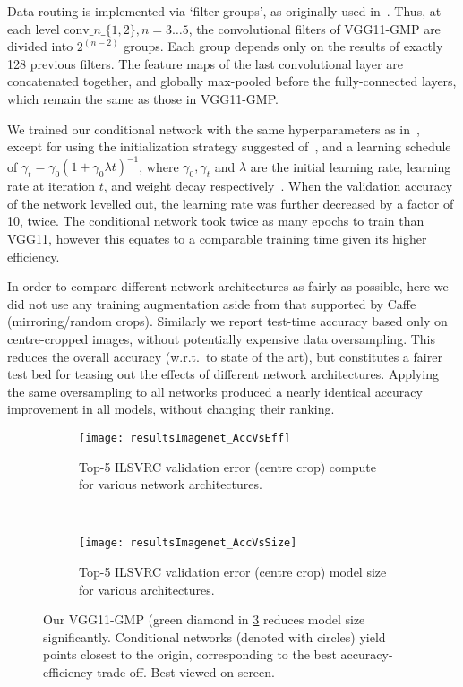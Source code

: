 \documentclass[thesis]{subfiles}
\begin{document}
Data routing is implemented via `filter groups', as originally used in~\cite{Krizhevsky2012imanet}. 
Thus, at each level $\textrm{conv}\_n\_\{1,2\}, n=3\ldots 5$, the convolutional filters of VGG11-GMP are 
divided into $2^{(n-2)}$ groups. Each group depends only on the results of exactly 128 previous filters. 
The feature maps of the last convolutional layer are concatenated together, and globally max-pooled
 before the fully-connected layers, which remain the same as those in VGG11-GMP.

We trained our conditional network with the same hyperparameters as in~\cite{Simonyan2014verydeep}, 
except for using the initialization strategy suggested of~\cite{He2015delving}, and a learning schedule of 
$\gamma_t = \gamma_0(1+\gamma_0\lambda t)^{-1}$, where $\gamma_0,\gamma_t$ and $\lambda$ 
are the initial learning rate, learning rate at iteration $t$, and weight decay respectively~\cite{Bottou2012sgdtricks}. 
When the validation accuracy of the network levelled out, the learning rate was further decreased by a factor of 10, twice. 
The conditional network took twice as many epochs to train than VGG11, however this equates to a comparable
 training time given its higher efficiency.

In order to compare different network architectures as fairly as possible, here we did not use any training
 augmentation aside from that supported by Caffe (mirroring/random crops). Similarly we report test-time 
 accuracy based only on centre-cropped images, without potentially expensive data oversampling. 
 This reduces the overall accuracy (w.r.t.\ to state of the art), but constitutes a fairer test bed for 
 teasing out the effects of different network architectures.
Applying the same oversampling to all networks produced a nearly identical accuracy improvement in 
all models, without changing their ranking.



\begin{figure}[htbp!] 
\centering
\begin{subfigure}[b]{\textwidth}
   \centering
   \texttt{[image: resultsImagenet\_AccVsEff]}
   \caption{Top-5 ILSVRC validation error (centre crop) \vs compute for various network architectures.}
   \label{fig:resultsImagenet_AccVsEff}
\end{subfigure}
~
\begin{subfigure}[b]{\textwidth}
   \centering
   \texttt{[image: resultsImagenet\_AccVsSize]}
   \caption{Top-5 ILSVRC validation error (centre crop) \vs model size for various architectures.}
   \label{fig:resultsImagenet_AccVsSize}
\end{subfigure}
\caption{Our VGG11-GMP (green diamond in \ref{fig:Imagenet_results} reduces model size significantly. Conditional networks (denoted with circles) yield points closest to the origin, corresponding to the best accuracy-efficiency trade-off. Best viewed on screen.}
\label{fig:Imagenet_results}
\end{figure}
\end{document}
